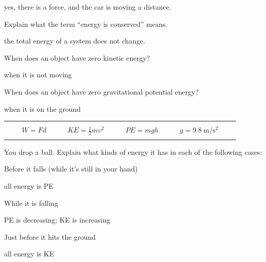 \documentclass[10pt]{exam}
\newcommand{\printeqs}{
  \ifprintanswers
  \else
    \begin{center}
      \begin{tabular}{|*9c*5c|}
        \hline 
        &&&&&&&&&&&&&\\
        && 
        $W=Fd$                 & & & 
        $KE = \frac{1}{2}mv^2$ & & & 
        $PE=mgh$               & & & 
        $g=\SI{9.8}{\meter\per\second^2}$
        &&\\
        &&&&&&&&&&&&&\\
        \hline 
      \end{tabular}
    \end{center}
  \fi
}
\begin{document}
\begin{questions}
\begin{parts}
      \begin{solution}[3em]
        yes, there is a force, and the car is moving a distance.
      \end{solution}

  \end{parts}

\question
  Explain what the term ``energy is conserved'' means.

  \begin{solution}[\stretch{1}]
    the total energy of a system does not change.
  \end{solution}

\question
  When does an object have zero kinetic energy? 

  \begin{solution}[3em]
    when it is not moving
  \end{solution}

\question
  When does an object have zero gravitational potential energy?

  \begin{solution}[3em]
    when it is on the ground
  \end{solution}

\pagebreak
\printeqs

\question
  You drop a ball.  Explain what kinds of energy it has in each of the following cases:

  \begin{parts}
    \item 
      Before it falls (while it's still in your hand)

        \begin{solution}[3em]
          all energy is PE
        \end{solution}

    \item 
      While it is falling

        \begin{solution}[3em]
          PE is decreasing; KE is increasing
        \end{solution}

    \item 
      Just before it hits the ground

        \begin{solution}[3em]
          all energy is KE
        \end{solution}

  \end{parts}



\end{questions}
\end{document}
